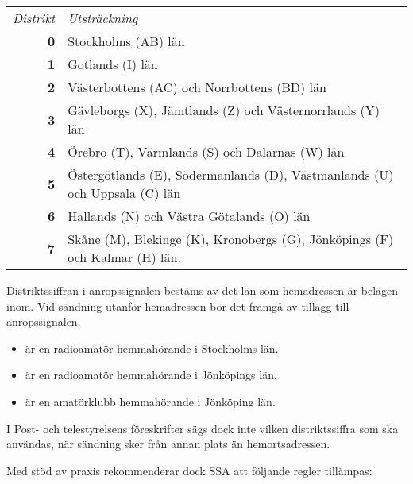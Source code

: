 \begin{center}
\begin{tabular}{rp{6cm}}
\emph{Distrikt} & \emph{Utsträckning} \\
\textbf{0} & Stockholms (AB) län \\
\textbf{1} & Gotlands (I) län \\
\textbf{2} & Västerbottens (AC) och Norrbottens (BD) län \\
\textbf{3} & Gävleborgs (X), Jämtlands (Z) och Västernorrlands (Y) län \\
\textbf{4} & Örebro (T), Värmlands (S) och Dalarnas (W) län \\
\textbf{5} & Östergötlands (E), Södermanlands (D), Västmanlands (U) och Uppsala (C) län\\
\textbf{6} & Hallands (N) och Västra Götalands (O) län \\
\textbf{7} & Skåne (M), Blekinge (K), Kronobergs (G), Jönköpings (F) och Kalmar (H) län.\\
\end{tabular}
\end{center}

Distriktssiffran i anropssignalen bestäms av det län som hemadressen är belägen inom.
Vid sändning utanför hemadressen bör det framgå av tillägg till anropssignalen.

\begin{exempelbox}
	\begin{itemize}
		\item {} är en radioamatör hemmahörande i Stockholms län.
		\item {} är en radioamatör hemmahörande i Jönköpings län.
		\item {} är en amatörklubb hemmahörande i Jönköping län.
	\end{itemize}
\end{exempelbox}
\medskip

I Post- och telestyrelsens föreskrifter sägs dock inte vilken distriktssiffra
som ska användas, när sändning sker från annan plats än hemortsadressen.

Med stöd av praxis rekommenderar dock SSA att följande regler tillämpas:


